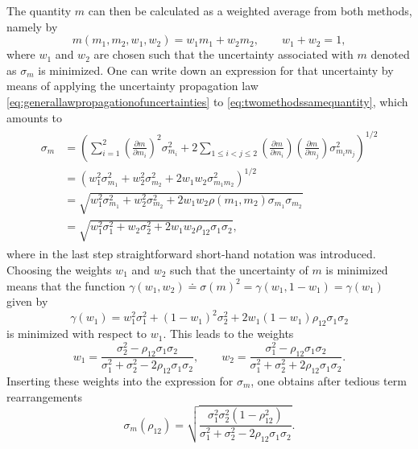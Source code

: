 \documentclass{report}
\numberwithin{tm}{section}
\begin{document}
The quantity $m$ can then be calculated as a weighted average from both methods, namely by \begin{equation}\label{eq:twomethodssamequantity}
	m(m_1,m_2,w_1,w_2) = w_1m_1 + w_2m_2, \qquad w_1 + w_2 = 1,
\end{equation} where $w_1$ and $w_2$ are chosen such that the uncertainty associated with $m$ denoted as $\sigma_m$ is minimized. One can write down an expression for that uncertainty by means of applying the uncertainty propagation law \cref{eq:generallawpropagationofuncertainties} to \cref{eq:twomethodssamequantity}, which amounts to \begin{align}
\begin{aligned}
	\sigma_m &= \left(\sum_{i=1}^{2}\left(\frac{\partial m}{\partial m_i}\right)^2\sigma_{m_i}^2 + 2\sum_{1\leq i<j\leq 2}\left(\frac{\partial m}{\partial m_i}\right)\left(\frac{\partial m}{\partial m_j}\right)\sigma_{m_im_j}^2\right)^{1/2} \\
	&= \left(w_1^2\sigma_{m_1}^2 + w_2^2\sigma_{m_2}^2 + 2w_1w_2\sigma_{m_1m_2}^2\right)^{1/2} \\
	&= \sqrt{w_1^2\sigma_{m_1}^2+w_2^2\sigma_{m_2}^2 + 2w_1w_2\rho(m_1,m_2)\sigma_{m_1}\sigma_{m_2}} \\
	&= \sqrt{w_1^2\sigma_1^2 + w_2\sigma_2^2 +2w_1w_2\rho_{12} \sigma_1\sigma_2},
\end{aligned}
\end{align} where in the last step straightforward short-hand notation was introduced. Choosing the weights $w_1$ and $w_2$ such that the uncertainty of $m$ is minimized means that the function $\gamma(w_1,w_2) \doteq \sigma(m)^2 = \gamma(w_1,1-w_1) = \gamma(w_1)$ given by \begin{equation}
 \gamma(w_1) = w_1^2\sigma_1^2 + (1-w_1)^2\sigma_2^2 + 2w_1(1-w_1)\rho_{12}\sigma_1\sigma_2
\end{equation} is minimized with respect to $w_1$. This leads to the weights \begin{equation}
w_1 = \frac{\sigma_2^2 - \rho_{12}\sigma_1\sigma_2}{\sigma_1^2+ \sigma_2^2 - 2\rho_{12}\sigma_1\sigma_2}, \qquad w_2 = \frac{\sigma_1^2-\rho_{12}\sigma_1\sigma_2}{\sigma_1^2+ \sigma_2^2 + 2\rho_{12}\sigma_1\sigma_2}.
\end{equation} Inserting these weights into the expression for $\sigma_m$, one obtains after tedious term rearrangements \begin{equation}\label{eq:combined_uncertainty}
\sigma_m(\rho_{12}) = \sqrt{\frac{\sigma_1^2\sigma_2^2(1-\rho_{12}^2)}{\sigma_1^2+\sigma_2^2-2\rho_{12}\sigma_1\sigma_2}}.

\end{equation}
\end{document}
